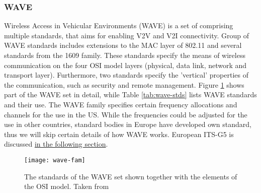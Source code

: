 \subsubsection{WAVE}
% 
\begin{center}
\end{center}\par
% 
Wireless Access in Vehicular Environments (WAVE) is a set of comprising multiple standards, that aims for enabling V2V and V2I connectivity. Group of WAVE standards includes extensions to the MAC layer of 802.11 and several standards from the 1609 family. These standards specify the means of wireless communication on the four OSI model layers (physical, data link, network and transport layer). Furthermore, two standards specify the 'vertical' properties of the communication, such as security and remote management. Figure \ref{fig:wave-fam} shows part of the WAVE set in detail, while Table \ref{tab:wave-stds} lists WAVE standards and their use. The WAVE family specifies certain frequency allocations and channels for the use in the US. While the frequencies could be adjusted for the use in other countries, standard bodies in Europe have developed own standard, thus we will skip certain details of how WAVE works. European ITS-G5 is discussed \hyperref[sec:ITS-G5]{in the following section}.\par
% 
\begin{figure}
    \centering
    \texttt{[image: wave-fam]}
    \caption{The standards of the WAVE set shown together with the elements of the OSI model. Taken from \cite{VehicularTechnologySociety2014IEEEArchitecture}}
    \label{fig:wave-fam}
\end{figure}

